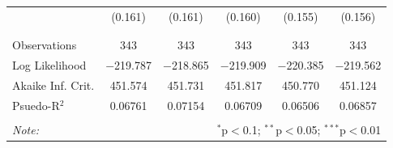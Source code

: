 \documentclass[12pt]{article}
\begin{document}
\begin{table}[!htbp]
\begin{tabular}{@{\extracolsep{5pt}}lccccc}
  & (0.161) & (0.161) & (0.160) & (0.155) & (0.156) \\ 
  & & & & & \\ 
\hline \\[-1.8ex] 
Observations & 343 & 343 & 343 & 343 & 343 \\ 
Log Likelihood & $-$219.787 & $-$218.865 & $-$219.909 & $-$220.385 & $-$219.562 \\ 
Akaike Inf. Crit. & 451.574 & 451.731 & 451.817 & 450.770 & 451.124 \\ 
Psuedo-R$^{2}$ & 0.06761 & 0.07154 & 0.06709 & 0.06506 & 0.06857 \\
\hline 
\hline \\[-1.8ex] 
\textit{Note:}  & \multicolumn{5}{r}{$^{*}$p$<$0.1; $^{**}$p$<$0.05; $^{***}$p$<$0.01} \\ 
\end{tabular} 
\end{table} 


\end{document}
